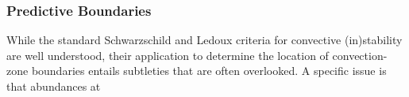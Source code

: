 {\color{brown}
\subsubsection{Predictive Boundaries}

While the standard Schwarzschild and Ledoux criteria for convective (in)stability are well understood, their application to determine the location of convection-zone boundaries entails subtleties that are often overlooked. A specific issue is that abundances at 

}